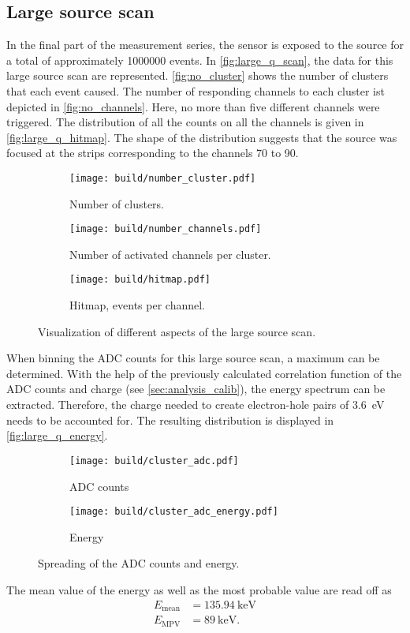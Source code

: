 \subsection{Large source scan}
\label{sec:large_q}
In the final part of the measurement series, the sensor is exposed to the source for a total of approximately \num{1000000} events. In \autoref{fig:large_q_scan}, 
the data for this large source scan are represented. \autoref{fig:no_cluster} shows the number of clusters that each event caused. The number of responding channels
to each cluster ist depicted in \autoref{fig:no_channels}. Here, no more than five different channels were triggered. The distribution of all the counts on all the
channels is given in \autoref{fig:large_q_hitmap}. The shape of the distribution suggests that the source was focused at the strips corresponding to the channels
70 to 90.
\begin{figure}
    \centering
    \begin{subfigure}{0.49\textwidth}
      \texttt{[image: build/number\_cluster.pdf]}
      \caption{Number of clusters.}
      \label{fig:no_cluster}
    \end{subfigure}
    \hfill
    \begin{subfigure}{0.49\textwidth}
      \texttt{[image: build/number\_channels.pdf]}
      \caption{Number of activated channels per cluster.}
      \label{fig:no_channels}
    \end{subfigure}
    \vfill
    \begin{subfigure}{0.49\textwidth}
        \texttt{[image: build/hitmap.pdf]}
        \caption{Hitmap, events per channel.}
        \label{fig:large_q_hitmap}
      \end{subfigure}
    \caption{Visualization of different aspects of the large source scan.}
    \label{fig:large_q_scan}
  \end{figure}

  When binning the ADC counts for this large source scan, a maximum can be determined. With the help of the previously calculated correlation function of the 
  ADC counts and charge (see \autoref{sec:analysis_calib}), the energy spectrum can be extracted. Therefore, the charge needed to create electron-hole pairs of
  \qty{3.6}{\electronvolt} needs to be accounted for. The resulting distribution is displayed in \autoref{fig:large_q_energy}.

  \begin{figure}
    \centering
    \begin{subfigure}{0.49\textwidth}
        \texttt{[image: build/cluster\_adc.pdf]}
        \caption{ADC counts}
        \label{fig:large_q_adc}
    \end{subfigure}
    \hfill
    \begin{subfigure}{0.49\textwidth}
        \texttt{[image: build/cluster\_adc\_energy.pdf]}
        \caption{Energy}
        \label{fig:large_q_energy}
    \end{subfigure}
    \caption{Spreading of the ADC counts and energy.}
    \label{fig:large_q_adc_energy}
\end{figure}

The mean value of the energy as well as the most probable value are read off as
\begin{align*}
    E_{\mathrm{mean}} &= \qty{135.94}{\kilo\electronvolt} \\
    E_{\mathrm{MPV}}  &= \qty{89}{\kilo\electronvolt}. \\
\end{align*}
